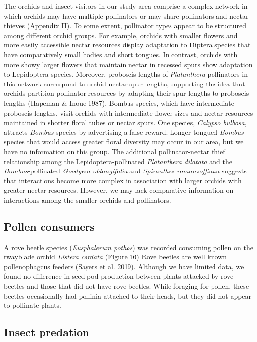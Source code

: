 \begin{multicols}{2}
The orchids and insect visitors in our study area comprise a complex
network in which orchids may have multiple pollinators or may share
pollinators and nectar thieves (Appendix II). To some extent, pollinator
types appear to be structured among different orchid groups. For
example, orchids with smaller flowers and more easily accessible nectar
resources display adaptation to Diptera species that have comparatively
small bodies and short tongues. In contrast, orchids with more showy
larger flowers that maintain nectar in recessed spurs show adaptation to
Lepidoptera species. Moreover, proboscis lengths of \emph{Platanthera}
pollinators in this network correspond to orchid nectar spur lengths,
supporting the idea that orchids partition pollinator resources by
adapting their spur lengths to proboscis lengths (Hapeman \& Inoue
1987). Bombus species, which have intermediate proboscis lengths, visit
orchids with intermediate flower sizes and nectar resources maintained
in shorter floral tubes or nectar spurs. One species, \emph{Calypso
bulbosa}, attracts \emph{Bombus} species by advertising a false reward.
Longer-tongued \emph{Bombus} species that would access greater floral
diversity may occur in our area, but we have no information on this
group. The additional pollinator-nectar thief relationship among the
Lepidoptera-pollinated \emph{Platanthera dilatata} and the
\emph{Bombus}-pollinated \emph{Goodyera oblongifolia} and
\emph{Spiranthes romanzoffiana} suggests that interactions become more
complex in association with larger orchids with greater nectar
resources. However, we may lack comparative information on interactions
among the smaller orchids and pollinators.

\subsection{Pollen consumers}

A rove beetle species (\emph{Eusphalerum pothos}) was recorded consuming
pollen on the twayblade orchid \emph{Listera cordata} (Figure 16) Rove
beetles are well known pollenophagous feeders (Sayers et al. 2019).
Although we have limited data, we found no difference in seed pod
production between plants attacked by rove beetles and those that did
not have rove beetles. While foraging for pollen, these beetles
occasionally had pollinia attached to their heads, but they did not
appear to pollinate plants.

\subsection{Insect predation}


\end{multicols}
